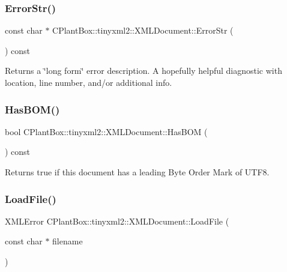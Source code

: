 \subsubsection{\texorpdfstring{Error\+Str()}{ErrorStr()}}
{\footnotesize\ttfamily const char $\ast$ C\+Plant\+Box\+::tinyxml2\+::\+X\+M\+L\+Document\+::\+Error\+Str (\begin{DoxyParamCaption}{ }\end{DoxyParamCaption}) const}

Returns a \char`\"{}long form\char`\"{} error description. A hopefully helpful diagnostic with location, line number, and/or additional info. \mbox{\label{classCPlantBox_1_1tinyxml2_1_1XMLDocument_ad92261e0a002bf0cdf5126a6ef60d3ff}} 
\subsubsection{\texorpdfstring{Has\+B\+O\+M()}{HasBOM()}}
{\footnotesize\ttfamily bool C\+Plant\+Box\+::tinyxml2\+::\+X\+M\+L\+Document\+::\+Has\+B\+OM (\begin{DoxyParamCaption}{ }\end{DoxyParamCaption}) const\hspace{0.3cm}{\ttfamily [inline]}}

Returns true if this document has a leading Byte Order Mark of U\+T\+F8. \mbox{\label{classCPlantBox_1_1tinyxml2_1_1XMLDocument_aab50b8d76fb1bb23a26e44f79de10ecf}} 
\subsubsection{\texorpdfstring{Load\+File()}{LoadFile()}\hspace{0.1cm}{\footnotesize\ttfamily [1/2]}}
{\footnotesize\ttfamily X\+M\+L\+Error C\+Plant\+Box\+::tinyxml2\+::\+X\+M\+L\+Document\+::\+Load\+File (\begin{DoxyParamCaption}\item[{const char $\ast$}]{filename }\end{DoxyParamCaption})}

